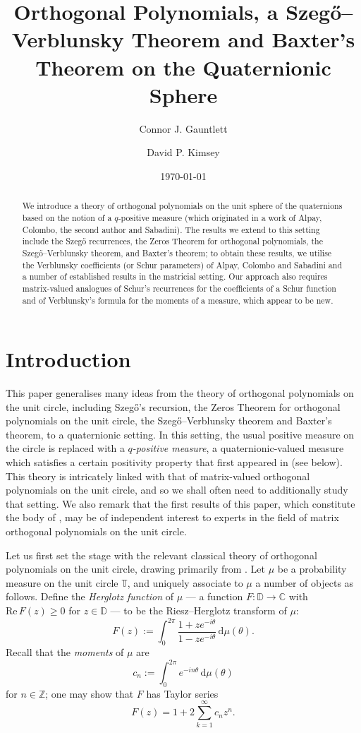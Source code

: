 \documentclass[11pt,reqno]{amsart}
\title[Quaternionic Orthogonal Polynomials, a S--V Theorem \& Baxter's Theorem]{Orthogonal Polynomials, a Szeg\H{o}--Verblunsky Theorem and Baxter's Theorem on the Quaternionic Sphere}
\date{\today}
\author[C. J. Gauntlett]{Connor J. Gauntlett}
\author[D. P. Kimsey]{David P. Kimsey}
\def\th{\theta}
\def\rmd{\mathrm{d}}
\def\ZZ{\mathbb{Z}}
\def\CC{\mathbb{C}}
\def\DD{\mathbb{D}}
\def\TT{\mathbb{T}}
\theoremstyle{definition}
\numberwithin{equation}{section}
\renewcommand{\Re}{\mathrm{Re}\,}
\begin{document}
\begin{abstract}
    We introduce a theory of orthogonal polynomials on the unit sphere of the quaternions based on the notion of a $q$-positive measure (which originated in a work of Alpay, Colombo, the second author and Sabadini). The results we extend to this setting include the Szeg\H{o} recurrences, the Zeros Theorem for orthogonal polynomials, the Szeg\H{o}--Verblunsky theorem, and Baxter's theorem; to obtain these results, we utilise the Verblunsky coefficients (or Schur parameters) of Alpay, Colombo and Sabadini and a number of established results in the matricial setting. Our approach also requires matrix-valued analogues of Schur's recurrences for the coefficients of a Schur function and of Verblunsky's formula for the moments of a measure, which appear to be new. 
\end{abstract}

\maketitle

\tableofcontents

\section{Introduction}

This paper generalises many ideas from the theory of orthogonal polynomials on the unit circle, including Szeg\H{o}'s recursion, the Zeros Theorem for orthogonal polynomials on the unit circle, the Szeg\H{o}--Verblunsky theorem and Baxter's theorem, to a quaternionic setting. In this setting, the usual positive measure on the circle is replaced with a \emph{$q$-positive measure}, a quaternionic-valued measure which satisfies a certain positivity property that first appeared in \cite{ACKS15} (see  below). This theory is intricately linked with that of matrix-valued orthogonal polynomials on the unit circle, and so we shall often need to additionally study that setting. We also remark that the first results of this paper, which constitute the body of , may be of independent interest to experts in the field of matrix orthogonal polynomials on the unit circle.

Let us first set the stage with the relevant classical theory of orthogonal polynomials on the unit circle, drawing primarily from \cite{Sim05a}. Let \(\mu\) be a probability measure on the unit circle \(\TT\), and uniquely associate to \(\mu\) a number of objects as follows. Define the \emph{Herglotz function} of \(\mu\) --- a function \(F : \DD \to \CC\) with \(\Re F(z) \geq 0\) for \(z \in \DD\) --- to be the Riesz--Herglotz transform of \(\mu\):
\[
    F(z) := \int_0^{2\pi} \frac{1 + ze^{-i\th}}{1 - ze^{-i\th}} \, \rmd\mu(\th).
\]
Recall that the \emph{moments} of \(\mu\) are
\[
    c_n := \int_0^{2\pi} e^{-in\th} \, \rmd\mu(\th)
\]
for \(n \in \ZZ\); one may show that \(F\) has Taylor series
\[
    F(z) = 1 + 2 \sum_{k=1}^{\infty} c_n z^n.
\]
\end{document}
